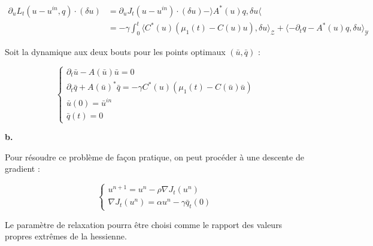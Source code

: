 \documentclass[a4paper]{article}
\newcommand{\Y}{\mathscr{Y}}
\newcommand{\Z}{\mathscr{Z}}
\begin{document}
\[ \begin{split}
\partial_{u}L_t(u-u^{in},q) \cdot (\delta u) &= \partial_u J_t(u-u^{in}) \cdot (\delta u)  - \rangle A^*(u)q , \delta u \langle \\
                                      &= - \gamma \int_0^t \langle C^*(u) (\mu_1(t) - C(u)u ), \delta u \rangle_{\Z} 
										 + \langle - \partial_t q - A^*(u)q , \delta u \rangle_{\Y}
\end{split}\]

Soit la dynamique aux deux bouts pour les points optimaux $(\bar{u},\bar{q})$ :

\[
\begin{cases}
	\partial_t \bar{u} - A(\bar{u})\bar{u} =0 \\
	\partial_t \bar{q} + A(\bar{u})^* \bar{q} = - \gamma C^*(u) (\mu_1(t) - C(\bar{u})\bar{u} ) \\
	\bar{u}(0) = \bar{u}^{in}\\
	\bar{q}(t) = 0
\end{cases}
\]

\textbf{b.}

Pour résoudre ce problème de façon pratique, on peut procéder à une descente de gradient :

\[
\begin{cases}
    u^{n+1} = u^n - \rho \nabla J_t (u^n) \\
	\nabla J_t(u^n) = \alpha u^n - \gamma \bar{q}_t(0)
\end{cases}
\]

Le paramètre de relaxation pourra être choisi comme le rapport des valeurs propres extrêmes de la hessienne.











	
\end{document}
